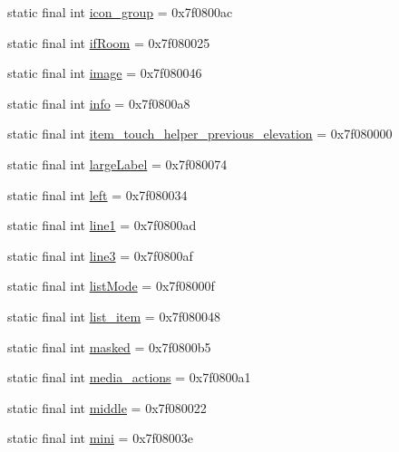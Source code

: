 \begin{CompactItemize}
static final int \hyperlink{classandroid_1_1support_1_1mediacompat_1_1_r_1_1id_4c293a61f150d6ae6aab6ad96437ac58}{icon\_\-group} = 0x7f0800ac
\item 
static final int \hyperlink{classandroid_1_1support_1_1mediacompat_1_1_r_1_1id_d00c1f655663a0492b1acf75a0f519f7}{ifRoom} = 0x7f080025
\item 
static final int \hyperlink{classandroid_1_1support_1_1mediacompat_1_1_r_1_1id_c1860019997938fdeb495af5af8c6ad5}{image} = 0x7f080046
\item 
static final int \hyperlink{classandroid_1_1support_1_1mediacompat_1_1_r_1_1id_919fb5d4c70370c1355dbf5509d7c3e2}{info} = 0x7f0800a8
\item 
static final int \hyperlink{classandroid_1_1support_1_1mediacompat_1_1_r_1_1id_3645b24ed08d78d20e7bfed82c92da6a}{item\_\-touch\_\-helper\_\-previous\_\-elevation} = 0x7f080000
\item 
static final int \hyperlink{classandroid_1_1support_1_1mediacompat_1_1_r_1_1id_69ed23072620cbefa479d130388d651a}{largeLabel} = 0x7f080074
\item 
static final int \hyperlink{classandroid_1_1support_1_1mediacompat_1_1_r_1_1id_b8cdbf4b1743782137cc16ae39960a07}{left} = 0x7f080034
\item 
static final int \hyperlink{classandroid_1_1support_1_1mediacompat_1_1_r_1_1id_480802c74b278ad9a77601f02a6d001b}{line1} = 0x7f0800ad
\item 
static final int \hyperlink{classandroid_1_1support_1_1mediacompat_1_1_r_1_1id_42cdb76f4f8ba549447e831c33a50479}{line3} = 0x7f0800af
\item 
static final int \hyperlink{classandroid_1_1support_1_1mediacompat_1_1_r_1_1id_640eac45f7b1f77f9fc45795704d3dc6}{listMode} = 0x7f08000f
\item 
static final int \hyperlink{classandroid_1_1support_1_1mediacompat_1_1_r_1_1id_1e7b3c7b52e31d33f8f84c07483dde67}{list\_\-item} = 0x7f080048
\item 
static final int \hyperlink{classandroid_1_1support_1_1mediacompat_1_1_r_1_1id_8649d359cf0dcdff6ebe980adaa73016}{masked} = 0x7f0800b5
\item 
static final int \hyperlink{classandroid_1_1support_1_1mediacompat_1_1_r_1_1id_238768d5d0c83b16e508591abb997719}{media\_\-actions} = 0x7f0800a1
\item 
static final int \hyperlink{classandroid_1_1support_1_1mediacompat_1_1_r_1_1id_4768c9c34c4004a99cdb3bbfdd3040d8}{middle} = 0x7f080022
\item 
static final int \hyperlink{classandroid_1_1support_1_1mediacompat_1_1_r_1_1id_bd023be09be8ad32a506526bb706db2f}{mini} = 0x7f08003e

\end{CompactItemize}
